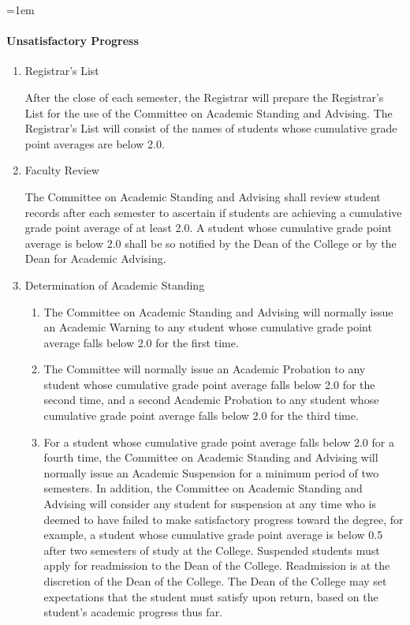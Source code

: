 \documentclass{manual}
\newcommand{\modified}[1]{}
\let\oldparagraph\paragraph
\renewcommand\paragraph{\leftskip=1em\oldparagraph}
\newcommand{\itemLevelA}{\alph*.}
\newcommand{\itemLevelB}{\arabic*)}
\newcommand{\itemRefA}{\alph*}
\newcommand{\itemRefB}{\arabic*}
\begin{document}
\paragraph{Unsatisfactory Progress}\label{par:UnsatisfactoryProgress}

\begin{enumerate}[label=\itemLevelA,ref=\itemRefA]
\item Registrar's List \modified{4/14/09}

      After the close of each semester, the Registrar will prepare the Registrar's List for the use of the        Committee on Academic Standing and Advising. The Registrar's List will consist of the names of        students whose cumulative grade point averages are below 2.0.

\item Faculty Review \modified{4/14/09}        

The Committee on Academic Standing and Advising shall review student records after each semester to ascertain if students are achieving a cumulative grade point average of at least 2.0. A student whose cumulative grade point average is below 2.0 shall be so notified by the Dean of the College or by the Dean for Academic Advising.

\item Determination of Academic Standing \modified{4/14/09}       

\begin{enumerate}[label=\itemLevelB,ref=\itemRefB]
\item The Committee on Academic Standing and Advising will normally issue an Academic Warning to any student whose cumulative grade point average falls below 2.0 for the first time. 
\item The Committee will normally issue an Academic Probation to any student whose cumulative grade point average falls below 2.0 for the second time, and a second Academic Probation to any student whose cumulative grade point average falls below 2.0 for the third time. 
\item For a student whose cumulative grade point average falls below 2.0 for a fourth time, the Committee on Academic Standing and Advising will normally issue an Academic Suspension for a minimum period of two semesters. In addition, the Committee on Academic Standing and Advising will consider any student for suspension at any time\modified{5/08/12} who is deemed to have failed to make satisfactory progress toward the degree, for example, a student whose cumulative grade point average is below 0.5 after two semesters of study at the College. Suspended students must apply for readmission to the Dean of the College. Readmission is at the discretion of the Dean of the College. The Dean of the College may set expectations that the student must satisfy upon return, based on the student's academic progress thus far.
\end{enumerate}


\end{enumerate}
\end{document}
